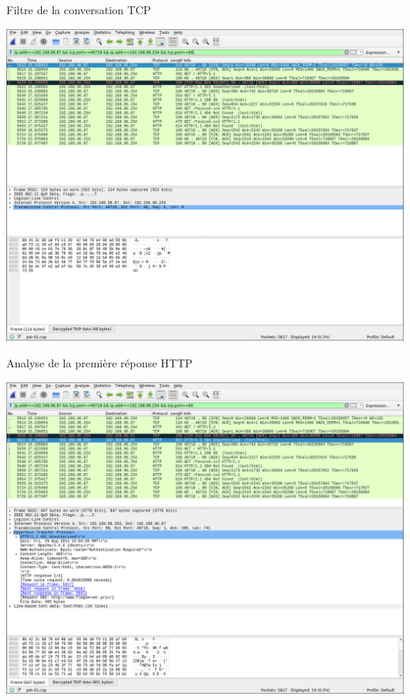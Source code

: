 \documentclass[10pt,sans,usenames,dvipsnames,french,compress]{beamer}
\begin{document}
\begin{frame}{Filtre de la conversation TCP}
	\vspace{-2mm}
	\begin{center}
		\includegraphics[width=0.85\linewidth]{118/wireshark4}
	\end{center}
\end{frame}

\begin{frame}{Analyse de la première réponse HTTP}
	\vspace{-2mm}
	\begin{center}
		\includegraphics[width=0.85\linewidth]{118/wireshark5}
	\end{center}
\end{frame}
\end{document}
